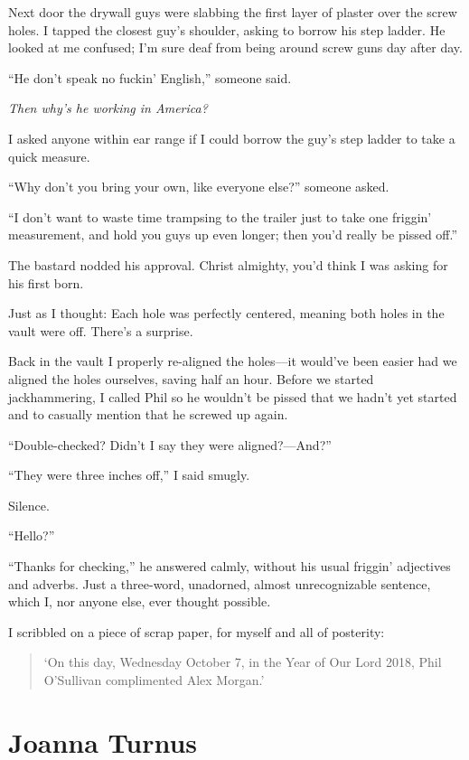 Next door the drywall guys were slabbing the first layer of plaster over
the screw holes. I tapped the closest guy's shoulder, asking to borrow
his step ladder. He looked at me confused; I'm sure deaf from being
around screw guns day after day.

``He don't speak no fuckin' English,'' someone said.

\emph{Then why's he working in America?}

I asked anyone within ear range if I could borrow the guy's step ladder
to take a quick measure.

``Why don't you bring your own, like everyone else?'' someone asked.

``I don't want to waste time trampsing to the trailer just to take one
friggin' measurement, and hold you guys up even longer; then you'd
really be pissed off.''

The bastard nodded his approval. Christ almighty, you'd think I was
asking for his first born.

Just as I thought: Each hole was perfectly centered, meaning both holes
in the vault were off. There's a surprise.

Back in the vault I properly re-aligned the holes---it would've been
easier had we aligned the holes ourselves, saving half an hour. Before
we started jackhammering, I called Phil so he wouldn't be pissed that we
hadn't yet started and to casually mention that he screwed up again.

``Double-checked? Didn't I say they were aligned?---And?''

``They were three inches off,'' I said smugly.

Silence.

``Hello?''

``Thanks for checking,'' he answered calmly, without his usual friggin'
adjectives and adverbs. Just a three-word, unadorned, almost
unrecognizable sentence, which I, nor anyone else, ever thought
possible.

I scribbled on a piece of scrap paper, for myself and all of posterity:

\begin{quote}
`On this day, Wednesday October 7, in the Year of Our Lord 2018, Phil
O'Sullivan complimented Alex Morgan.'
\end{quote}

\chapter{Joanna Turnus}

